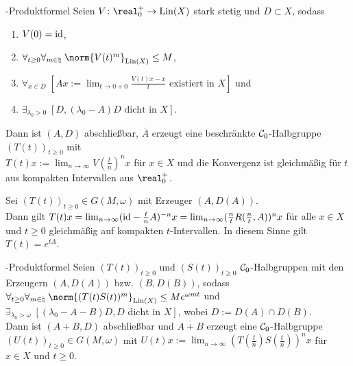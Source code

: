 \begin{Satz}{-Produktformel}
    Seien $V\colon \real_0^+ \to \Lin(X)$ stark stetig und $D \subset X$, sodass
    \begin{enumerate}
        \item
        $V(0) = \text{id}$,
        
        \item
        $\forall_{t \ge 0} \forall_{m \in \natural}\; \norm{V(t)^m}_{\Lin(X)} \le M$,
        
        \item
        $\forall_{x \in D}\;
        [\text{$Ax := \lim_{t \to 0+0} \frac{V(t)x - x}{t}$ existiert in $X$}]$ und
        
        \item
        $\exists_{\lambda_0 > 0}\; [\text{$D, (\lambda_0 - A)D$ dicht in $X$}]$.
    \end{enumerate}
    Dann ist $(A, D)$ abschließbar, $\overline{A}$ erzeugt eine beschränkte $\mathcal{C}_0$-Halbgruppe
    $(T(t))_{t \ge 0}$ mit\\
    $T(t)x := \lim_{n \to \infty} V(\frac{t}{n})^n x$ für $x \in X$ und
    die Konvergenz ist gleichmäßig für $t$ aus kompakten Intervallen aus $\real^+_0$.
\end{Satz}

\begin{Bsp}
    Sei $(T(t))_{t \ge 0} \in G(M, \omega)$ mit Erzeuger $(A, D(A))$.\\
    Dann gilt $T(t)x = \lim_{n \to \infty} (\text{id} - \frac{t}{n} A)^{-n} x
    = \lim_{n \to \infty} (\frac{n}{t} R(\frac{n}{t}, A))^n x$ für alle $x \in X$ und $t \ge 0$
    gleichmäßig auf kompakten $t$-Intervallen.
    In diesem Sinne gilt $T(t) = e^{tA}$.
\end{Bsp}

\linie

\begin{Satz}{-Produktformel}
    Seien $(T(t))_{t \ge 0}$ und $(S(t))_{t \ge 0}$ $\mathcal{C}_0$-Halbgruppen mit den Erzeugern
    $(A, D(A))$ bzw. $(B, D(B))$, sodass $\forall_{t \ge 0} \forall_{m \in \natural}\;
    \norm{(T(t)S(t))^m}_{\Lin(X)} \le Me^{\omega mt}$ und\\
    $\exists_{\lambda_0 > \omega}\; [\text{$(\lambda_0 - A - B)D, D$ dicht in $X$}]$, wobei
    $D := D(A) \cap D(B)$.\\
    Dann ist $(A + B, D)$ abschließbar und $\overline{A + B}$ erzeugt eine
    $\mathcal{C}_0$-Halbgruppe $(U(t))_{t \ge 0} \in G(M, \omega)$ mit
    $U(t)x := \lim_{n \to \infty} (T(\frac{t}{n}) S(\frac{t}{n}))^n x$ für $x \in X$ und $t \ge 0$.
\end{Satz}

